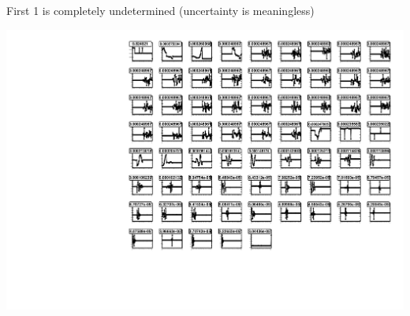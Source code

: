 \documentclass[compress]{beamer}
\begin{document}
\begin{frame}
{First 1 is completely undetermined (uncertainty is meaningless)

\includegraphics[width=0.9\linewidth]{newplots_errors_YEp1_phiz.pdf}}
\end{frame}
\end{document}
